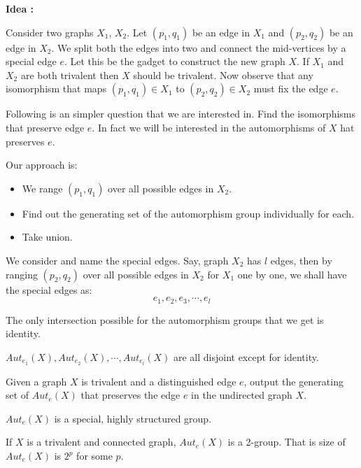 \textbf{Idea :}

Consider two graphs $X_1$, $X_2$. Let $(p_1,q_1)$ be an edge in $X_1$ and $(p_2,q_2)$ be an edge in $X_2$. We split both the edges  into two and connect the mid-vertices by a special edge $e$. Let this be the gadget to construct the new graph $X$. If $X_1$ and $X_2$ are both trivalent then $X$ should be trivalent. Now observe that any isomorphism that maps $(p_1,q_1)\in X_1$ to $(p_2,q_2)\in X_2$ must fix the edge $e$. 

Following is an simpler question that we are interested in. Find the isomorphisms that preserve edge $e$. In fact we will be interested in the automorphisms of $X$ hat preserves $e$. 

Our approach is:
\begin{itemize}
\item We range $(p_1,q_1)$ over all possible edges in $X_2$. 
\item Find out the generating set of the automorphism group individually for each. 
\item Take union.
\end{itemize}
  
  We consider and name the special edges. Say, graph $X_2$ has $l$ edges, then by ranging $(p_2,q_2)$ over all possible edges in $X_2$ for $X_1$ one by one, we shall have the special edges as:
   \[ e_1, e_2 , e_3,\cdots,e_l\]
  \begin{observation} The only intersection possible for the automorphism groups that we get is identity.
  \end{observation}
  $ Aut_{e_{1}}(X), Aut_{e_{2}}(X),\cdots,Aut_{e_{l}}(X)$ are all disjoint except for identity.
  
 \begin{problem} Given a graph $X$ is trivalent 
 and a distinguished edge $e$, output the generating set of $Aut_e(X)$ that preserves the edge $e$ in the undirected graph $X$.
  \end{problem}

$Aut_e(X)$ is a special, highly structured group.

\begin{theorem} If $X$ is a trivalent and connected graph, $Aut_e(X)$ is a 2-group. That is size of  $Aut_e(X)$ is $2^p$ for some $p$.
\end{theorem}






